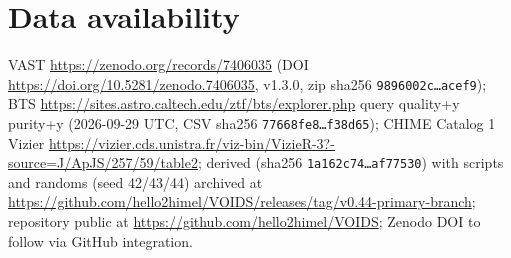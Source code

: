 \section{Data availability}
VAST \url{https://zenodo.org/records/7406035} (DOI \url{https://doi.org/10.5281/zenodo.7406035}, v1.3.0, zip sha256 \texttt{9896002c\ldots acef9}); BTS \url{https://sites.astro.caltech.edu/ztf/bts/explorer.php} query quality+y purity+y (2026-09-29 UTC, CSV sha256 \texttt{77668fe8\ldots f38d65}); CHIME Catalog 1 Vizier \url{https://vizier.cds.unistra.fr/viz-bin/VizieR-3?-source=J/ApJS/257/59/table2}; derived  (sha256 \texttt{1a162c74\ldots af77530}) with scripts and randoms (seed 42/43/44) archived at \url{https://github.com/hello2himel/VOIDS/releases/tag/v0.44-primary-branch}; repository public at \url{https://github.com/hello2himel/VOIDS}; Zenodo DOI to follow via GitHub integration.
\clearpage
